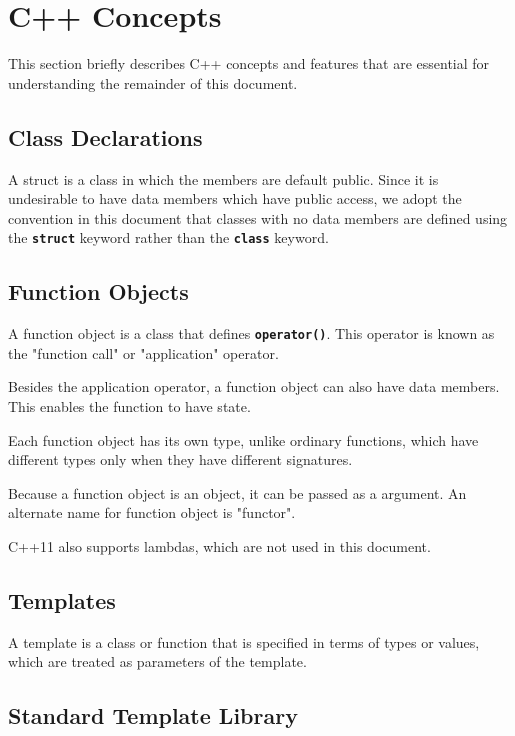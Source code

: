 \documentclass{report}
\begin{document}

\section{C++ Concepts}

This section briefly describes C++ concepts and features that are
essential for understanding the remainder of this document.

\subsection{Class Declarations}

A struct is a class in which the members are default public.
Since it is undesirable to have data members which have public access,
we adopt the convention in this document
that classes with no data members are defined using the
\texttt{{\bf struct}}
keyword rather than the
\texttt{{\bf class}}
keyword.

\subsection{Function Objects}

A function object is a class that defines
\texttt{{\bf operator()}}.
This operator is known as the "function call" or "application" operator.

Besides the application operator, a function object can also have
data members.  This enables the function to have state.

Each function object has its own type, unlike ordinary functions, which
have different types only when they have different signatures.

Because a function object is an object, it can be passed as a argument.
An alternate name for function object is "functor".

C++11 also supports lambdas, which are not used in this document.

\subsection{Templates}

A template is a class or function that is specified in terms of types
or values, which are treated as parameters of the template.

\subsection{Standard Template Library}
\end{document}
